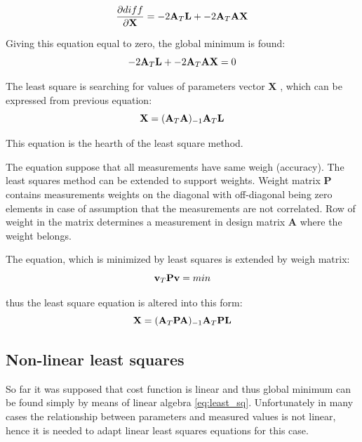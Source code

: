 \documentclass[a4paper,12pt]{report}
\newcommand{\ematr}[1]{
{\bf #1}
}
\newcommand{\evect}[1]{
{\bf #1}
}
\begin{document}
\begin{equation}
\frac{\partial diff}{\partial \evect{X}} = -2\ematr{A}_{T} \evect{L} + -2\ematr{A}_{T}\ematr{A} \evect{X} 
\label{eq:least_part}
\end{equation} 

Giving this equation equal to zero, the global minimum is found:
\begin{equation}
-2\ematr{A}_{T} \evect{L} + -2\ematr{A}_{T}\ematr{A} \evect{X} = 0 
\end{equation} 

The least square is searching for values of parameters vector \evect{X}, which can be expressed from previous equation:
\begin{equation}
\evect{X} = (\ematr{A}_{T} \ematr{A})_{-1} \ematr{A}_{T} \ematr{L}
\end{equation}

This equation is the hearth of the least square method.

The equation suppose that all measurements have same weigh (accuracy). The least squares method can be extended to support weights.
Weight matrix \ematr{P} contains measurements weights on the diagonal with off-diagonal being zero elements in case of assumption that 
the measurements are not correlated.
Row of weight in the matrix determines a measurement in design matrix \ematr{A} where the weight belongs.

The equation, which is minimized by least squares is extended by weigh matrix:
\begin{equation}
\evect{v}_{T}  \ematr{P} \evect{v} = min
\end{equation}

thus the least square equation is altered into this form:
\begin{equation}
\evect{X} = (\ematr{A}_{T} \ematr{P} \ematr{A})_{-1} \ematr{A}_{T} \ematr{P} \ematr{L}
\label{eq:least_sq}
\end{equation}

\subsection{Non-linear least squares}
\label{sec:non_least}
So far it was supposed that cost function is linear and thus global minimum can be found simply by means of linear algebra  \eqref{eq:least_sq}.
Unfortunately in many cases the relationship between parameters and 
measured values is not linear, hence it is needed to adapt linear least squares equations for this case.
\end{document}
